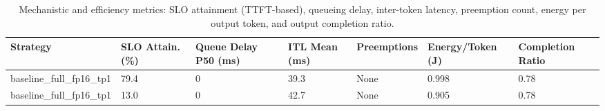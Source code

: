 \begin{table}
\caption{Mechanistic and efficiency metrics: SLO attainment (TTFT-based), queueing delay, inter-token latency, preemption count, energy per output token, and output completion ratio.}
\label{tab:efficiency}
\begin{tabular}{lllllll}
\toprule
Strategy & SLO Attain. (\%) & Queue Delay P50 (ms) & ITL Mean (ms) & Preemptions & Energy/Token (J) & Completion Ratio \\
\midrule
baseline\_full\_fp16\_tp1 & 79.4 & 0 & 39.3 & None & 0.998 & 0.78 \\
baseline\_full\_fp16\_tp1 & 13.0 & 0 & 42.7 & None & 0.905 & 0.78 \\
\bottomrule
\end{tabular}
\end{table}
